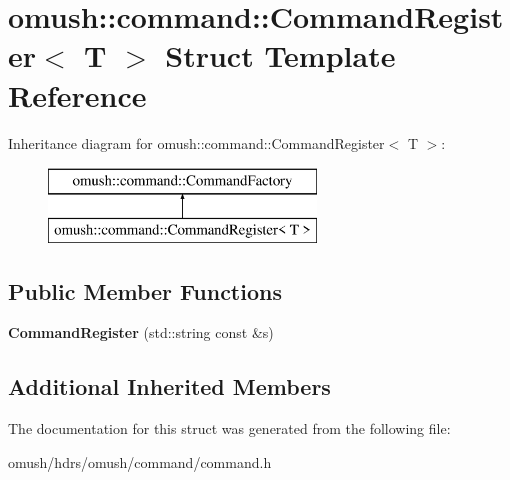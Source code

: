\hypertarget{structomush_1_1command_1_1_command_register}{\section{omush\-:\-:command\-:\-:Command\-Register$<$ T $>$ Struct Template Reference}
\label{structomush_1_1command_1_1_command_register}
}
Inheritance diagram for omush\-:\-:command\-:\-:Command\-Register$<$ T $>$\-:\begin{figure}[H]
\begin{center}
\leavevmode
\includegraphics[height=2.000000cm]{structomush_1_1command_1_1_command_register}
\end{center}
\end{figure}
\subsection*{Public Member Functions}
\begin{DoxyCompactItemize}
\item 
\hypertarget{structomush_1_1command_1_1_command_register_a1e2c2880bafe8fd657e9d2809809b4eb}{{\bfseries Command\-Register} (std\-::string const \&s)}\label{structomush_1_1command_1_1_command_register_a1e2c2880bafe8fd657e9d2809809b4eb}

\end{DoxyCompactItemize}
\subsection*{Additional Inherited Members}


The documentation for this struct was generated from the following file\-:\begin{DoxyCompactItemize}
\item 
omush/hdrs/omush/command/command.\-h\end{DoxyCompactItemize}
